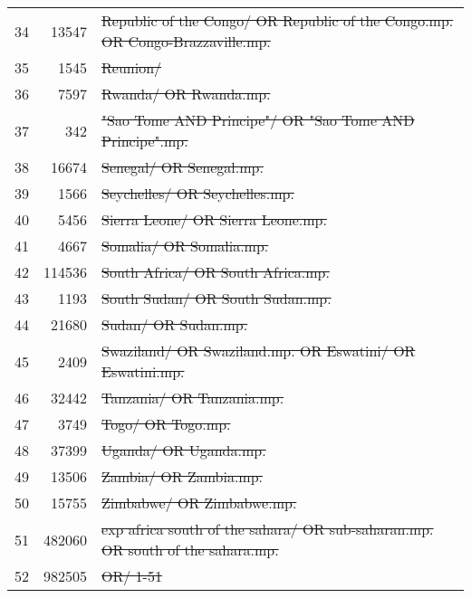 \begin{tabular}{R{.01}R{.06}L{.84}}
	34 &  \num{13547} & \st{Republic of the Congo/ OR Republic of the Congo.mp. OR Congo-Brazzaville.mp.}         \\
	35 &   \num{1545} & \st{Reunion/}                                                                             \\
	36 &   \num{7597} & \st{Rwanda/ OR Rwanda.mp.}                                                                \\
	37 &    \num{342} & \st{"Sao Tome AND Principe"/ OR "Sao Tome AND Principe".mp.}                              \\
	38 &  \num{16674} & \st{Senegal/ OR Senegal.mp.}                                                              \\
	39 &   \num{1566} & \st{Seychelles/ OR Seychelles.mp.}                                                        \\
	40 &   \num{5456} & \st{Sierra Leone/ OR Sierra Leone.mp.}                                                    \\
	41 &   \num{4667} & \st{Somalia/ OR Somalia.mp.}                                                              \\
	42 & \num{114536} & \st{South Africa/ OR South Africa.mp.}                                                    \\
	43 &   \num{1193} & \st{South Sudan/ OR South Sudan.mp.}                                                      \\
	44 &  \num{21680} & \st{Sudan/ OR Sudan.mp.}                                                                  \\
	45 &   \num{2409} & \st{Swaziland/ OR Swaziland.mp. OR Eswatini/ OR Eswatini.mp.}                             \\
	46 &  \num{32442} & \st{Tanzania/ OR Tanzania.mp.}                                                            \\
	47 &   \num{3749} & \st{Togo/ OR Togo.mp.}                                                                    \\
	48 &  \num{37399} & \st{Uganda/ OR Uganda.mp.}                                                                \\
	49 &  \num{13506} & \st{Zambia/ OR Zambia.mp.}                                                                \\
	50 &  \num{15755} & \st{Zimbabwe/ OR Zimbabwe.mp.}                                                            \\
	51 & \num{482060} & \st{exp africa south of the sahara/ OR sub-saharan.mp. OR south of the sahara.mp.}        \\
	52 & \num{982505} & \st{OR/ 1-51}                                                                             \\
	\bottomrule
\end{tabular}